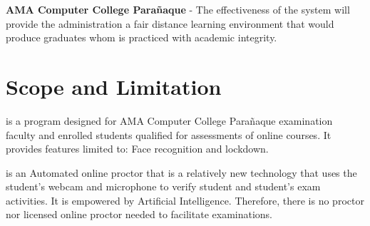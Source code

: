 \textbf{AMA Computer College Parañaque} - The effectiveness of the system will provide the administration a fair distance learning environment that would produce graduates whom is practiced with academic integrity.

\section{Scope and Limitation}

\projectName is a program designed for AMA Computer College Parañaque examination faculty and enrolled students qualified for assessments of online courses.
It provides features limited to: Face recognition and lockdown.

\projectName is an Automated online proctor that is a relatively new technology that uses the student’s webcam and microphone to verify student and student’s exam activities.
It is empowered by Artificial Intelligence.
Therefore, there is no proctor nor licensed online proctor needed to facilitate examinations.
